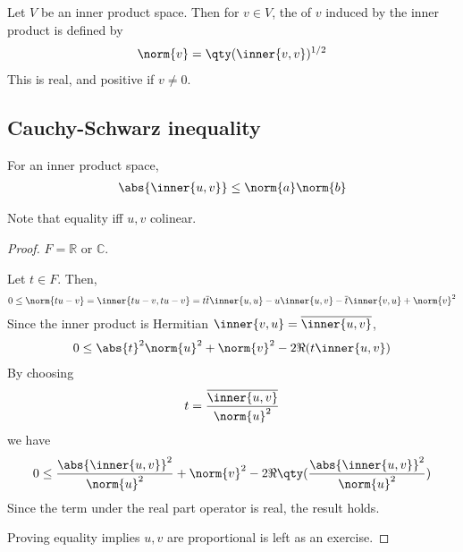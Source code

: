 \begin{definition}[Norm]
	Let $V$ be an inner product space.
	Then for $v \in V$, the  of $v$ induced by the inner product is defined by
	\begin{align*}
		\norm{v} = \qty(\inner{v,v})^{1/2}
	\end{align*}
	This is real, and positive if $v \neq 0$.
\end{definition}

\subsection{Cauchy-Schwarz inequality}
\begin{lemma}
	For an inner product space,
	\begin{align*}
		\abs{\inner{u,v}} \leq \norm{a} \norm{b}
	\end{align*}
\end{lemma}

\begin{remark}
	Note that equality iff $u, v$ colinear.
\end{remark} 

\begin{proof}
	$F = \mathbb{R}$ or $\mathbb{C}$.

	Let $t \in F$.
	Then,
	\begin{align*}
		0 \leq \norm{t u - v} = \inner{tu - v, tu - v} = t \overline t \inner{u,u} - u \inner{u,v} - \overline t \inner{v,u} + \norm{v}^2
	\end{align*}
	Since the inner product is Hermitian $\inner{v, u} = \overline{\inner{u, v}}$,
	\begin{align*}
		0 \leq \abs{t}^2 \norm{u}^2 + \norm{v}^2 - 2 \Re(t \inner{u,v})
	\end{align*}
	By choosing
	\begin{align*}
		t = \frac{\overline{\inner{u,v}}}{\norm{u}^2}
	\end{align*}
	we have
	\begin{align*}
		0 \leq \frac{\abs{\inner{u,v}}^2}{\norm{u}^2} + \norm{v}^2 - 2 \Re\qty(\frac{\abs{\inner{u,v}}^2}{\norm{u}^2})
	\end{align*}
	Since the term under the real part operator is real, the result holds.

	Proving equality implies $u, v$ are proportional is left as an exercise.
\end{proof}


